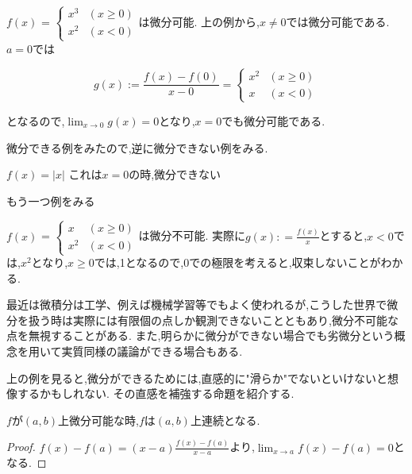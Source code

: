 \begin{epl}
$f(x)$ = $
\begin{cases}
x^3 & (x \ge 0)\\
x^2 & (x < 0)
\end{cases}
$は微分可能.
上の例から,$x \neq 0$では微分可能である.
$a = 0$では

\begin{equation*}
g(x) := \frac{f(x) -f(0)}{x - 0} =
\begin{cases}
x^2 & (x \ge 0)\\
x & (x < 0)
\end{cases}
\end{equation*}

となるので,$\displaystyle \lim_{x \to 0} g(x) = 0$となり,$x = 0$でも微分可能である.
\end{epl}


微分できる例をみたので,逆に微分できない例をみる.


\begin{epl}
$f(x) = |x|$
これは$x=0$の時,微分できない
\end{epl}


もう一つ例をみる


\begin{epl}
$f(x)$ = $
\begin{cases}
x & (x \ge 0)\\
x^2 & (x < 0)
\end{cases}
$は微分不可能.
実際に$g(x): = \frac{f(x)}{x}$とすると,$x < 0$では,$x^2$となり,$x \ge 0$では,1となるので,$0$での極限を考えると,収束しないことがわかる.
\end{epl}


\begin{rem}
最近は微積分は工学、例えば機械学習等でもよく使われるが,こうした世界で微分を扱う時は実際には有限個の点しか観測できないことともあり,微分不可能な点を無視することがある.
また,明らかに微分ができない場合でも劣微分という概念を用いて実質同様の議論ができる場合もある.
\end{rem}


上の例を見ると,微分ができるためには,直感的に"滑らか"でないといけないと想像するかもしれない.
その直感を補強する命題を紹介する.


\begin{prop}
$f$が$(a,b)$上微分可能な時,$f$は$(a,b)$上連続となる.
\end{prop}


\begin{proof}
$f(x) - f(a) = (x-a) \frac{f(x) - f(a)}{x -a}$より,$\lim_{x \to a}f(x) - f(a) = 0$となる.
\end{proof}


